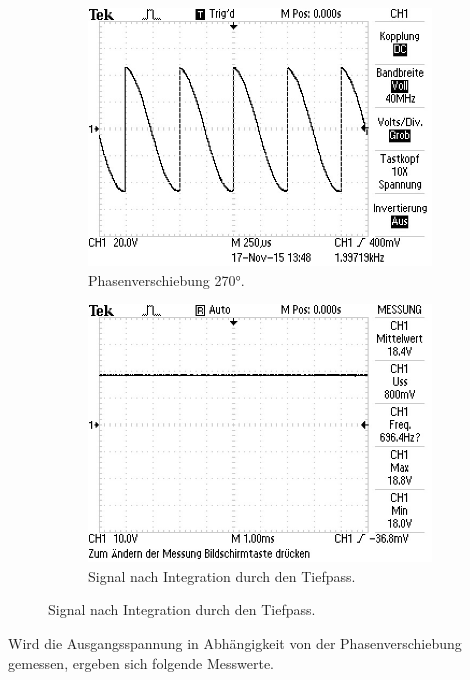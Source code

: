 \begin{figure}
  \centering
  \begin{subfigure}{0.48\textwidth}
    \centering
    \includegraphics[width=\textwidth]{bilder/Ohne Rauschen/5.JPG}
    \caption{Phasenverschiebung 270°.}
    \label{fig:bild5}
  \end{subfigure}
  \begin{subfigure}{0.48\textwidth}
    \centering
    \includegraphics[width=\textwidth]{bilder/Ohne Rauschen/6.JPG}
    \caption{Signal nach Integration durch den Tiefpass.}
    \label{fig:bild6}
  \end{subfigure}
\end{figure}

Wird die Ausgangsspannung in Abhängigkeit von der Phasenverschiebung gemessen, ergeben sich folgende Messwerte.

